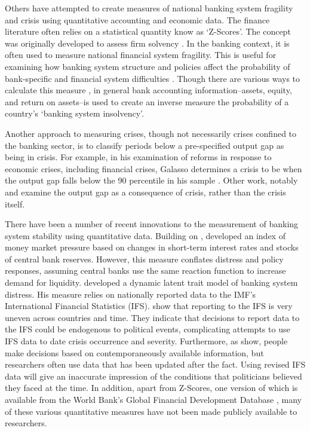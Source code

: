 \documentclass[]{article}
\begin{document}
Others have attempted to create measures of national banking system fragility and crisis using quantitative accounting and economic data. The finance literature often relies on a statistical quantity know as `Z-Scores'. The concept was originally developed to assess firm solvency \cite{roy1952}. In the banking context, it is often used to measure national financial system fragility. This is useful for examining how banking system structure and policies affect the probability of bank-specific and financial system difficulties \citep[e.g.][]{beck2013bank,vcihak2010islamic,laeven2009bank,uhde2009}. Though there are various ways to calculate this measure \citep[73]{Lepetit2013}, in general bank accounting information--assets, equity, and return on assets--is used to create an inverse measure the probability of a country's `banking system insolvency'.

Another approach to measuring crises, though not necessarily crises confined to the banking sector, is to classify periods below a pre-specified output gap as being in crisis. For example, in his examination of reforms in response to economic crises, including financial crises, Galasso determines a crisis to be when the output gap falls below the 90 percentile in his sample \citeyearpar[154]{galasso2014}. Other work, notably \cite{laeven2013} and \cite{Reinhart2009} examine the output gap as a consequence of crisis, rather than the crisis itself.

There have been a number of recent innovations to the measurement of banking system stability using quantitative data. Building on \cite{vonHagen2007}, \cite{Jing2015} developed an index of money market pressure based on changes in short-term interest rates and stocks of central bank reserves. However, this measure conflates distress and policy responses, assuming central banks use the same reaction function to increase demand for liquidity. \cite{Rosas2009} developed a dynamic latent trait model of banking system distress. His measure relies on nationally reported data to the IMF's International Financial Statistics (IFS). \cite{GandrudCopHal2015} show that reporting to the IFS is very uneven across countries and time. They indicate that decisions to report data to the IFS could be endogenous to political events, complicating attempts to use IFS data to date crisis occurrence and severity. Furthermore, as \cite{KayserLeininger2015} show, people make decisions based on contemporaneously available information, but researchers often use data that has been updated after the fact. Using revised IFS data will give an inaccurate impression of the conditions that politicians believed they faced at the time. In addition, apart from Z-Scores, one version of which is available from the World Bank's Global Financial Development Database \citep{worldbank2013}, many of these various quantitative measures have not been made publicly available to researchers.
\end{document}
